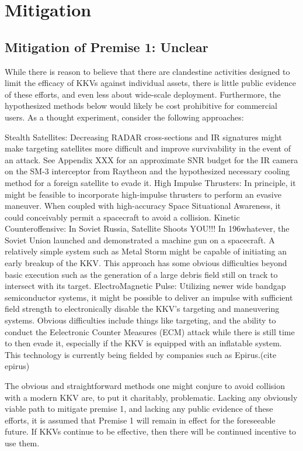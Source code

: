 \section{Mitigation}

\subsection{Mitigation of Premise 1: Unclear}
While there is reason to believe that there are clandestine activities designed to limit the efficacy of KKVs against individual assets, there is little public evidence of these efforts, and even less about wide-scale deployment.  Furthermore, the hypothesized methods below would likely be cost prohibitive for commercial users.  As a thought experiment, consider the following approaches:

Stealth Satellites: Decreasing RADAR cross-sections and IR signatures might make targeting satellites more difficult and improve survivability in the event of an attack.  See Appendix XXX for an approximate SNR budget for the IR camera on the SM-3 interceptor from Raytheon and the hypothesized necessary cooling method for a foreign satellite to evade it.
High Impulse Thrusters: In principle, it might be feasible to incorporate high-impulse thrusters to perform an evasive maneuver.  When coupled with high-accuracy Space Situational Awareness, it could conceivably permit a spacecraft to avoid a collision.
Kinetic Counteroffensive: In Soviet Russia, Satellite Shoots YOU!!!  In 196whatever, the Soviet Union launched and demonstrated a machine gun on a spacecraft.  A relatively simple system such as Metal Storm might be capable of initiating an early breakup of the KKV.  This approach has some obvious difficulties beyond basic execution such as the generation of a large debris field still on track to intersect with its target.
ElectroMagnetic Pulse: Utilizing newer wide bandgap semiconductor systems, it might be possible to deliver an impulse with sufficient field strength to electronically disable the KKV's targeting and maneuvering systems.  Obvious difficulties include things like targeting, and the ability to conduct the Eelectronic Counter Measures (ECM) attack while there is still time to then evade it, especially if the KKV is equipped with an inflatable system.  This technology is currently being fielded by companies such as Epirus.(cite epirus)

The obvious and straightforward methods one might conjure to avoid collision with a modern KKV are, to put it charitably, problematic.  Lacking any obviously viable path to mitigate premise 1, and lacking any public evidence of these efforts, it is assumed that Premise 1 will remain in effect for the foreseeable future.  If KKVs continue to be effective, then there will be continued incentive to use them.

